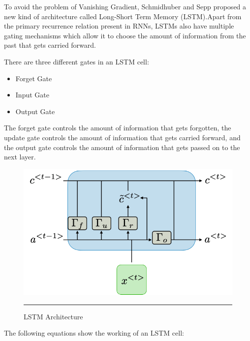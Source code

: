 To avoid the problem of Vanishing Gradient, Schmidhuber and Sepp proposed a new kind of architecture\cite{lstm_schmidhuber} called Long-Short Term Memory (LSTM).Apart from the primary recurrence relation present in RNNs, LSTMs also have multiple gating mechanisms which allow it to choose the amount of information from the past that gets carried forward.

There are three different gates in an LSTM cell: 
\begin{itemize}[noitemsep,topsep=0pt]
    \item Forget Gate
    \item Input Gate
    \item Output Gate
\end{itemize}
The forget gate controls the amount of information that gets forgotten, the update gate controls the amount of information that gets carried forward, and the output gate controls the amount of information that gets passed on to the next layer.\\

\begin{figure}[htbp]
  \centering
    \includegraphics[scale=0.3]{Figures/lstm-ltr.png}
    \rule{35em}{0.5pt}
  \caption[LSTM]{LSTM Architecture}
  \label{fig:lstm_architecture}
\end{figure}

The following equations show the working of an LSTM cell:

